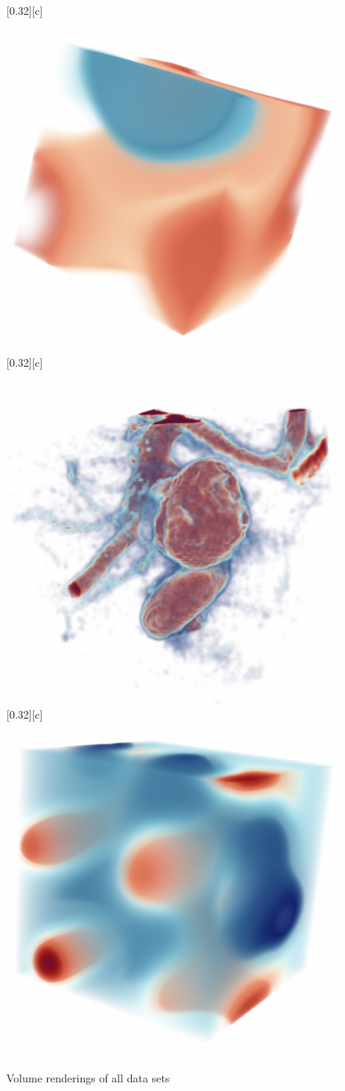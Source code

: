 \documentclass{article}
\begin{document}
\begin{figure}[htb]
        [0.32\linewidth][c]{%
                \includegraphics[width=0.22\linewidth]{img/supplementary/karfs.png}}
        [0.32\linewidth][c]{%
                \includegraphics[width=0.22\linewidth]{img/supplementary/aneurism.png}}
        [0.32\linewidth][c]{%
                \includegraphics[width=0.22\linewidth]{img/supplementary/velocityz.png}}
        \caption{Volume renderings of all data sets}
\end{figure}
\end{document}
